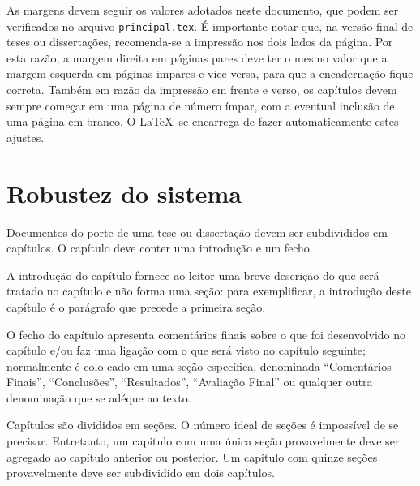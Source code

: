 As margens devem seguir os valores adotados neste documento, que podem
ser verificados no arquivo \texttt{principal.tex}. É importante notar
que, na versão final de teses ou dissertações, recomenda-se a
impressão nos dois lados da página. Por esta razão, a margem direita
em páginas pares deve ter o mesmo valor que a margem esquerda em
páginas impares e vice-versa, para que a encadernação fique
correta. Também em razão da impressão em frente e verso, os capítulos
devem sempre começar em uma página de número ímpar, com a eventual
inclusão de uma página em branco. O \LaTeX\ se encarrega de fazer
automaticamente estes ajustes.

\section{Robustez do sistema}
\label{RobustezSistema}

Documentos do porte de uma tese ou dissertação devem ser subdivididos
em capítulos. O capítulo deve conter uma introdução e um fecho.

A introdução do capítulo fornece ao leitor uma breve descrição do que
será tratado no capítulo e não forma uma seção: para exemplificar, a
introdução deste capítulo é o parágrafo que precede a primeira seção.

O fecho do capítulo apresenta comentários finais sobre o que foi
desenvolvido no capítulo e/ou faz uma ligação com o que será visto no
capítulo seguinte; normalmente é colo cado em uma seção específica,
denominada ``Comentários Finais'', ``Conclusões'', ``Resultados'',
``Avaliação Final'' ou qualquer outra denominação que se adéque ao
texto.

Capítulos são divididos em seções. O número ideal de seções é
impossível de se precisar. Entretanto, um capítulo com uma única seção
provavelmente deve ser agregado ao capítulo anterior ou posterior. Um
capítulo com quinze seções provavelmente deve ser subdividido em dois
capítulos.

